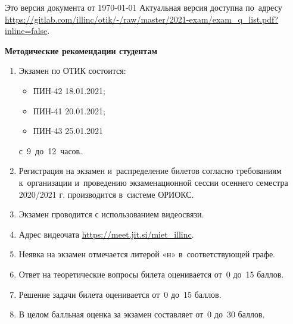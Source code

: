 \documentclass[a4paper,14pt]{extarticle}
\begin{document}

\setlength{\leftmargini}{1.5cm}
\raggedright

{
\Large

\textbf{\courseheading}
\title{\courseheading}
\medskip

}
{
\footnotesize


\makeatletter
\makeatother


}
{
\footnotesize

\noindent\hrulefill

Это версия документа от \today{}
% 
Актуальная версия доступна по~адресу 
\url{https://gitlab.com/illinc/otik/-/raw/master/2021-exam/exam_q_list.pdf?inline=false}.


}


\bigskip


\textbf{Методические рекомендации студентам}
\begin{enumerate}%
\item Экзамен по ОТИК состоится:
\begin{itemize}
\item ПИН-42	18.01.2021;
\item ПИН-41	20.01.2021;
\item ПИН-43	25.01.2021
\end{itemize}
\mbox{с~9 до 12 часов}.

\item Регистрация на экзамен и~распределение билетов согласно требованиям
к~организации и~проведению экзаменационной сессии
осеннего семестра 2020/2021 г.
производится в~системе ОРИОКС.


\item Экзамен 
проводится с использованием видеосвязи.



\item Адрес видеочата \url{https://meet.jit.si/miet_illinc}.

\item Неявка на экзамен отмечается литерой «н» в~соответствующей графе.

\item Ответ на теоретические вопросы билета оценивается от~0 до~15 баллов. 
\item Решение задачи билета оценивается от~0 до~15 баллов. 

\item В целом балльная оценка за экзамен составляет от~0 до~30 баллов.

\end{enumerate}
\end{document}
